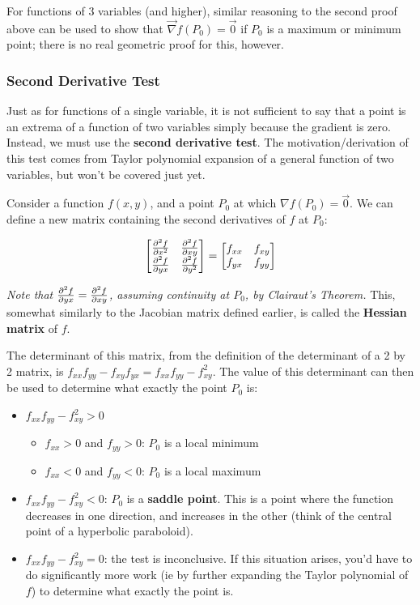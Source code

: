 \documentclass[12pt]{article}
\begin{document}
{For functions of 3 variables (and higher), similar reasoning to the second proof above can be used to show that $\vec{\nabla}f(P_0) = \vec{0}$ if $P_0$ is a maximum or minimum point; there is no real geometric proof for this, however.


\subsubsection{Second Derivative Test}

Just as for functions of a single variable, it is not sufficient to say that a point is an extrema of a function of two variables simply because the gradient is zero. Instead, we must use the \textbf{second derivative test}. The motivation/derivation of this test comes from Taylor polynomial expansion of a general function of two variables, but won't be covered just yet.

Consider a function $f(x,y)$, and a point $P_0$ at which $\nabla f(P_0) = \vec{0}$. We can define a new matrix containing the second derivatives of $f$ at $P_0$:

\begin{align*}
    \begin{bmatrix}
        \frac{\partial ^2f}{\partial x^2} & \frac{\partial ^2f}{\partial xy}\\
        \frac{\partial ^2f}{\partial yx} & \frac{\partial ^2f}{\partial y^2}
    \end{bmatrix} = \begin{bmatrix}
        f_{xx} & f_{xy}\\
        f_{yx} & f_{yy}
    \end{bmatrix}
\end{align*}

\textit{Note that $\frac{\partial ^2f}{\partial yx} = \frac{\partial ^2f}{\partial xy}$, assuming continuity at $P_0$, by Clairaut's Theorem.} This, somewhat similarly to the Jacobian matrix defined earlier, is called the \textbf{Hessian matrix} of $f$.

The determinant of this matrix, from the definition of the determinant of a 2 by 2 matrix, is $f_{xx}f_{yy} - f_{xy}f_{yx} = f_{xx}f_{yy} - f_{xy}^2$. The value of this determinant can then be used to determine what exactly the point $P_0$ is:

\begin{itemize}
    \item $f_{xx}f_{yy} - f_{xy}^2>0$
    \begin{itemize}
        \item $f_{xx} > 0$ and $f_{yy} > 0$: $P_0$ is a local minimum
        \item $f_{xx} < 0$ and $f_{yy} < 0$: $P_0$ is a local maximum
    \end{itemize}
    \item $f_{xx}f_{yy} - f_{xy}^2<0$: $P_0$ is a \textbf{saddle point}. This is a point where the function decreases in one direction, and increases in the other (think of the central point of a hyperbolic paraboloid). 
    \item $f_{xx}f_{yy} - f_{xy}^2=0$: the test is inconclusive. If this situation arises, you'd have to do significantly more work (ie by further expanding the Taylor polynomial of $f$) to determine what exactly the point is.
\end{itemize}

}
\end{document}
